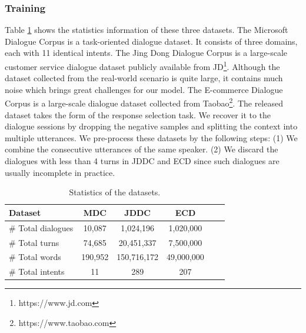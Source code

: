 \documentclass[11pt]{article}
\begin{document}
\subsubsection{Training}
Table \ref{tab:dataset_profile} shows the statistics information of these three datasets.
The Microsoft Dialogue Corpus is a task-oriented dialogue dataset.
It consists of three domains, each with 11 identical intents.
The Jing Dong Dialogue Corpus is a large-scale customer service dialogue dataset publicly available from JD\footnote{https://www.jd.com}.
Although the dataset collected from the real-world scenario is quite large, it contains much noise which brings great challenges for our model.
The E-commerce Dialogue Corpus is a large-scale dialogue dataset collected from Taobao\footnote{https://www.taobao.com}.
The released dataset takes the form of the response selection task.
We recover it to the dialogue sessions by dropping the negative samples and splitting the context into multiple utterances.
We pre-process these datasets by the following steps: (1) We combine the consecutive utterances of the same speaker. (2) We discard the dialogues with less than 4 turns in JDDC and ECD since such dialogues are usually incomplete in practice.

\begin{table}[tb]
    \centering
    \small
    \begin{tabular}{lccccc}
        \toprule
        \textbf{Dataset} & \textbf{MDC} & \textbf{JDDC} & \textbf{ECD}\\
        \midrule
        \# Total dialogues    &  10,087   &   1,024,196   &   1,020,000       \\
        \# Total turns   &  74,685   &   20,451,337  &   7,500,000   \\
        \# Total words        &  190,952         &   150,716,172 &   49,000,000 \\
        \# Total intents      &  11       &   289         &   207  \\
        \bottomrule
    \end{tabular}
    \caption{Statistics of the datasets.}
    \label{tab:dataset_profile}
\end{table}
\end{document}
